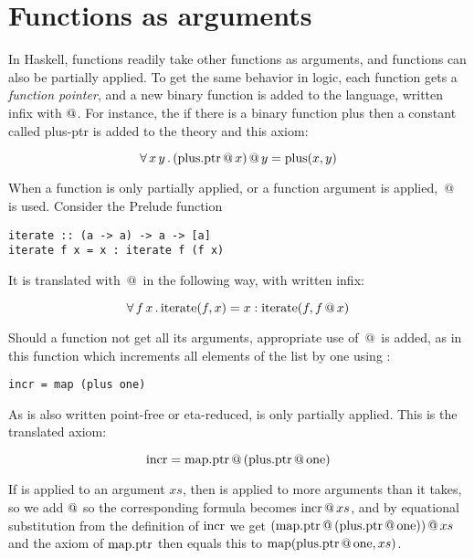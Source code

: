 \section{Functions as arguments}

In Haskell, functions readily take other functions as arguments, and
functions can also be partially applied. To get the same behavior in
logic, each function gets a \emph{function pointer}, and a new binary
function is added to the language, written infix with $\mathrm{@}$.
For instance, the if there is a binary function plus then a constant
called plus-ptr is added to the theory and this axiom:

\begin{equation*}
\forall \, x \, y \, . \, (\mathrm{plus.ptr} \, @ \, x) \, @ \, y = \mathrm{plus}(x,y)
\end{equation*}

When a function is only partially applied, or a function argument is
applied, $\, @ \, $ is used. Consider the Prelude function 

\begin{verbatim}
iterate :: (a -> a) -> a -> [a]
iterate f x = x : iterate f (f x)
\end{verbatim}

It is translated with $\, @ \, $ in the following way, with \hs{:} written infix:

\begin{equation*}
\forall \, f \, x \, . \, \mathrm{iterate}(f,x) = x : \mathrm{iterate}(f,f \, @ \, x)
\end{equation*}

Should a function not get all its arguments, appropriate use of $\, @ \, $ is
added, as in this function which increments all elements of the list
by one using :

\begin{verbatim}
incr = map (plus one)
\end{verbatim}

As  is also written point-free or eta-reduced,  is
only partially applied. This is the translated axiom:

\begin{equation*}
\mathrm{incr} = \mathrm{map.ptr} \, @ \, (\mathrm{plus.ptr} \, @ \, \mathrm{one})
\end{equation*}

If  is applied to an argument $xs$, then  is applied
to more arguments than it takes, so we add $@$ so the
corresponding formula becomes $\mathrm{incr} \, @ \, xs$, and by equational
substitution from the definition of $\mathrm{incr}$ we get
$(\mathrm{map.ptr} \, @ \, (\mathrm{plus.ptr} \, @ \, \mathrm{one})) \, @ \, xs$ and
the axiom of $\mathrm{map.ptr}$ then equals this to
$\mathrm{map}(\mathrm{plus.ptr} \, @ \, \mathrm{one},xs)$.

